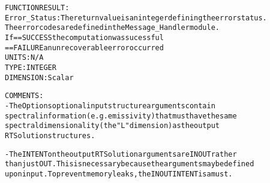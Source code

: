\begin{alltt}
  FUNCTION RESULT:
        Error_Status:   The return value is an integer defining the error status.
                        The error codes are defined in the Message_Handler module.
                        If == SUCCESS the computation was sucessful
                           == FAILURE an unrecoverable error occurred
                        UNITS:      N/A
                        TYPE:       INTEGER
                        DIMENSION:  Scalar
 
  COMMENTS:
        - The Options optional input structure arguments contain
          spectral information (e.g. emissivity) that must have the same
          spectral dimensionality (the "L" dimension) as the output
          RTSolution structures.
 
        - The INTENT on the output RTSolution arguments are IN OUT rather
          than just OUT. This is necessary because the arguments may be defined
          upon input. To prevent memory leaks, the IN OUT INTENT is a must.
 
  \end{alltt}
